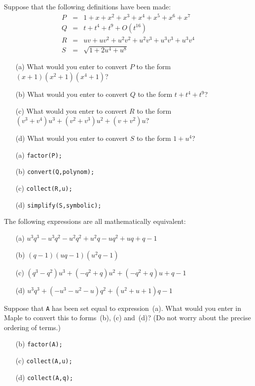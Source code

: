 \documentclass[a4paper]{article}
\begin{document}
\begin{problem}
 Suppose that the following definitions have been made:
 \begin{eqnarray*}
  P &=& 1+x+x^2+x^3+x^4+x^5+x^6+x^7 \\
  Q &=& t+t^4+t^9 + O(t^{16}) \\
  R &=& uv + uv^2 +u^2v^2 + u^2v^3 + u^3v^3 + u^3v^4 \\
  S &=& \sqrt{1 + 2u^4 + u^8}
 \end{eqnarray*}
 \begin{itemize}
  \item[(a)] What would you enter to convert $P$ to the form
   $(x+1)(x^2+1)(x^4+1)$? 
  \item[(b)] What would you enter to convert $Q$ to the form
   $t+t^4+t^9$?
  \item[(c)] What would you enter to convert $R$ to the form
   $(v^3+v^4)u^3+(v^2+v^3)u^2+(v+v^2)u$?
  \item[(d)] What would you enter to convert $S$ to the form
   $1+u^4$?
 \end{itemize}
\end{problem}
\begin{solution}
 \begin{itemize}
  \item[(a)] \verb~factor(P);~  \mk
  \item[(b)] \verb~convert(Q,polynom);~ \mk
  \item[(c)] \verb~collect(R,u);~ \mk
  \item[(d)] \verb~simplify(S,symbolic);~ \mk
 \end{itemize}
\end{solution}

\begin{problem}\label{ex-algebra-i}
 The following expressions are all mathematically equivalent:
 \begin{itemize}
  \item[(a)] $u^3q^3-u^3q^2-u^2q^2+u^2q-uq^2+uq+q-1$
  \item[(b)] $(q-1)(u q-1)(u^2 q-1)$
  \item[(c)] $(q^3-q^2)u^3+(-q^2+q)u^2+(-q^2+q)u+q-1$
  \item[(d)] $u^3q^3+(-u^3-u^2-u)q^2+(u^2+u+1)q-1$
 \end{itemize}
 Suppose that \verb~A~ has been set equal to
 expression~(a).  What would you enter in Maple to convert
 this to forms~(b), (c) and~(d)?  (Do not worry about the
 precise ordering of terms.)  
\end{problem}
\begin{solution}
 \begin{itemize}
  \item[(b)] \verb~factor(A);~    \hspace{2em}\mk
  \item[(c)] \verb~collect(A,u);~ \hspace{2em}\mk
  \item[(d)] \verb~collect(A,q);~ \hspace{2em}\mk
 \end{itemize}
\end{solution}
\end{document}
